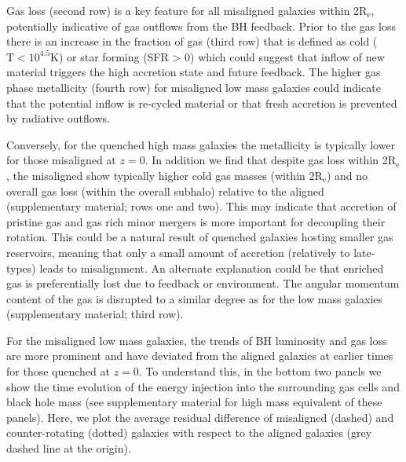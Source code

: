 \documentclass[fleqn,usenatbib]{mnras}
\begin{document}
Gas loss (second row) is a key feature for all misaligned galaxies within 2$\mathrm{R_{e}}$, potentially indicative of gas outflows from the BH feedback. Prior to the gas loss there is an increase in the fraction of gas (third row) that is defined as cold ($\mathrm{T < 10^{4.5}K}$) or star forming (SFR > 0) which could suggest that inflow of new material triggers the high accretion state and future feedback. The higher gas phase metallicity (fourth row) for misaligned low mass galaxies could indicate that the potential inflow is re-cycled material or that fresh accretion is prevented by radiative outflows.

Conversely, for the quenched high mass galaxies the metallicity is typically lower for those misaligned at $z=0$. In addition we find that despite gas loss within 2$\mathrm{R_{e}}$, the misaligned show typically higher cold gas masses (within 2$\mathrm{R_{e}}$) and no overall gas loss (within the overall subhalo) relative to the aligned (supplementary material; rows one and two). This may indicate that accretion of pristine gas and gas rich minor mergers is more important for decoupling their rotation. This could be a natural result of quenched galaxies hosting smaller gas reservoirs, meaning that only a small amount of accretion (relatively to late-types) leads to misalignment. An alternate explanation could be that enriched gas is preferentially lost due to feedback or environment. The angular momentum content of the gas is disrupted to a similar degree as for the low mass galaxies (supplementary material; third row).

For the misaligned low mass galaxies, the trends of BH luminosity and gas loss are more prominent and have deviated from the aligned galaxies at earlier times for those quenched at $z=0$. To understand this, in the bottom two panels we show the time evolution of the energy injection into the surrounding gas cells and black hole mass (see supplementary material for high mass equivalent of these panels). Here, we plot the average residual difference of misaligned (dashed) and counter-rotating (dotted) galaxies with respect to the aligned galaxies (grey dashed line at the origin). 
\end{document}
